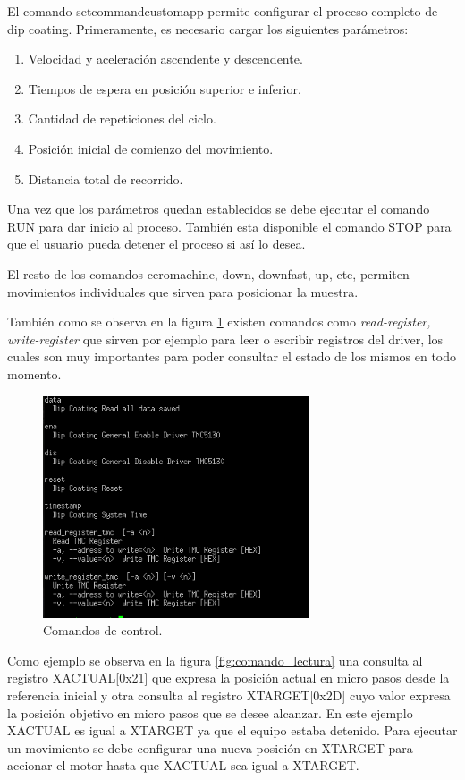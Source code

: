 El comando setcommandcustomapp permite configurar el proceso completo de dip coating. Primeramente, es necesario cargar los siguientes parámetros:

\begin{enumerate}
\item Velocidad y aceleración ascendente y descendente.
\item Tiempos de espera en posición superior e inferior.
\item Cantidad de repeticiones del ciclo.
\item Posición inicial de comienzo del movimiento.
\item Distancia total de recorrido.
\end{enumerate}

Una vez que los parámetros quedan establecidos se debe ejecutar el comando RUN para dar inicio al proceso. También esta disponible el comando STOP para que el usuario pueda detener el proceso si así lo desea.
 
El resto de los comandos ceromachine, down, downfast, up, etc, permiten movimientos individuales que sirven para posicionar la muestra.

También como se observa en la figura \ref{fig:consola_comandos} existen comandos como \textit{read-register, write-register} que sirven por ejemplo para leer o escribir registros del driver, los cuales son muy importantes para poder consultar el estado de los mismos en todo momento.


\begin{figure}[h!]
	\centering
	\includegraphics[width=0.7\textwidth]{./Figures/consola_3.png}
	\caption{Comandos de control.}
	\label{fig:consola_comandos}
\end{figure}

Como ejemplo se observa en la figura \ref{fig:comando_lectura} una consulta al registro XACTUAL[0x21] que expresa la posición actual en micro pasos desde la referencia inicial y otra consulta al registro XTARGET[0x2D] cuyo valor expresa la posición objetivo en micro pasos que se desee alcanzar.
En este ejemplo XACTUAL es igual a XTARGET ya que el equipo estaba detenido. Para ejecutar un movimiento se debe configurar una nueva posición en XTARGET para accionar el motor hasta que  XACTUAL sea igual a XTARGET.


